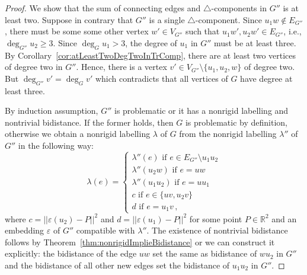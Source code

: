 \documentclass[a4paper, 11pt]{article}
\newcommand{\trcomp}{$\triangle$-component}
\newcommand{\trcomps}{$\triangle$-components}
\newcommand{\RR}{\mathbb{R}}
\theoremstyle{definition}
\begin{document}
\begin{proof}
We show that the sum of connecting edges and \trcomps{} in $G''$ is at least two. Suppose in contrary that $G''$ is a single \trcomp{}. Since $u_1w\notin E_{G''}$, there must be some some other vertex $w'\in V_{G''}$ such that $u_1w',u_2w'\in E_{G''}$, i.e., $\deg_{G''} u_2 \geq 3$. Since $\deg_G u_1>3$, the degree of $u_1$ in $G''$ must be at least three. By Corollary~\ref{cor:atLeastTwoDegTwoInTrComp}, there are at least two vertices of degree two in $G''$. Hence, there is a vertex $v'\in V_{G''}\setminus\{u_1,u_2,w\}$ of degree two. But $\deg_{G''}v'=\deg_G v'$ which contradicts that all vertices of $G$ have degree at least three. 

By induction assumption, $G''$ is problematic or it has a nonrigid labelling and nontrivial bidistance. If the former holds, then $G$ is problematic by definition, otherwise we obtain a nonrigid labelling $\lambda$ of $G$ from the nonrigid labelling $\lambda''$ of $G''$ in the following way:
$$
\lambda(e)=\begin{cases}
\lambda''(e) \text{ if } e\in E_{G''}\setminus u_1u_2\\
\lambda''(u_2w) \text{ if } e=uw\\
\lambda''(u_1u_2) \text{ if } e=uu_1\\
c \text{ if } e\in\{uv,u_2v\}\\
d \text{ if } e=u_1v\,,
\end{cases}
$$
where $c=||\varepsilon(u_2)-P||^2$ and $d=||\varepsilon(u_1)-P||^2$ for some point $P\in\RR^2$ and an embedding $\varepsilon$ of $G''$ compatible with $\lambda''$. The existence of nontrivial bidistance follows by Theorem~\ref{thm:nonrigidImplieBidistance} or we can construct it explicitly: the bidistance of the edge $uw$ set the same as bidistance of $wu_2$ in $G''$ and the bidistance of all other new edges set the bidistance of $u_1u_2$ in $G''$.


\end{proof}
\end{document}
